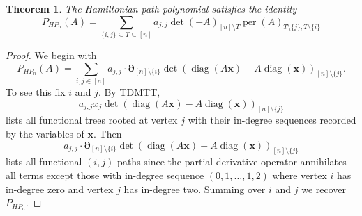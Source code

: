 \documentclass{article}
\newcommand{\diag}{\operatorname{diag}}
\newcommand{\per}{\operatorname{per}}
\theoremstyle{theorem}
\newtheorem*{thm*}{Theorem}
\theoremstyle{definition}
\begin{document}
\begin{thm*}
    The Hamiltonian path polynomial satisfies the identity
    \[
        P_{HP_n}(A)=\sum_{\{i,j\}\subseteq T\subseteq[n]}a_{j,j}\det(-A)_{[n]\setminus T}\per(A)_{T\setminus \{j\},T\setminus \{i\}}
    \]
\end{thm*}
\begin{proof}
    We begin with
    \[
        P_{HP_n}(A)=\sum_{i,j\in[n]}a_{j,j}\cdot\boldsymbol{\partial}_{[n]\setminus\{i\}}\det(\diag(A\boldsymbol{x})-A\diag(\boldsymbol{x}))_{[n]\setminus\{j\}}.
    \]
    To see this fix $i$ and $j$. By TDMTT,
    \[
        a_{j,j}x_j\det(\diag(A\boldsymbol{x})-A\diag(\boldsymbol{x}))_{[n]\setminus\{j\}}
    \]
    lists all functional trees rooted at vertex $j$ with their in-degree sequences recorded by the variables of $\boldsymbol{x}$. Then
    \[
        a_{j,j}\cdot\boldsymbol{\partial}_{[n]\setminus\{i\}}\det(\diag(A\boldsymbol{x})-A\diag(\boldsymbol{x}))_{[n]\setminus\{j\}}
    \]
    lists all functional $(i,j)$-paths since the partial derivative operator annihilates all terms except those with in-degree sequence $(0,1,\hdots,1,2)$ where vertex $i$ has in-degree zero and vertex $j$ has in-degree two. Summing over $i$ and $j$ we recover $P_{HP_n}$.


\end{proof}
\end{document}
